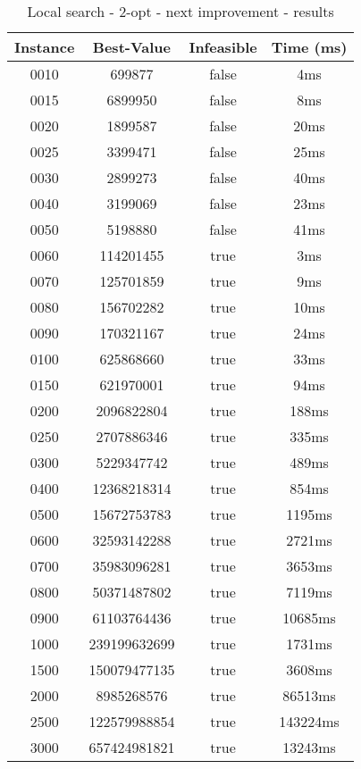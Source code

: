 \begin{table}
\centering
	\begin{tabular}{|| c | c | c | c ||} 
		\hline
		Instance & Best-Value & Infeasible & Time (ms) \\
		\hline\hline
0010 & 699877 & false & 4ms \\
0015 & 6899950 & false & 8ms \\
0020 & 1899587 & false & 20ms \\
0025 & 3399471 & false & 25ms \\
0030 & 2899273 & false & 40ms \\
0040 & 3199069 & false & 23ms \\
0050 & 5198880 & false & 41ms \\
0060 & 114201455 & true & 3ms \\
0070 & 125701859 & true & 9ms \\
0080 & 156702282 & true & 10ms \\
0090 & 170321167 & true & 24ms \\
0100 & 625868660 & true & 33ms \\
0150 & 621970001 & true & 94ms \\
0200 & 2096822804 & true & 188ms \\
0250 & 2707886346 & true & 335ms \\
0300 & 5229347742 & true & 489ms \\
0400 & 12368218314 & true & 854ms \\
0500 & 15672753783 & true & 1195ms \\
0600 & 32593142288 & true & 2721ms \\
0700 & 35983096281 & true & 3653ms \\
0800 & 50371487802 & true & 7119ms \\
0900 & 61103764436 & true & 10685ms \\
1000 & 239199632699 & true & 1731ms \\
1500 & 150079477135 & true & 3608ms \\
2000 & 8985268576 & true & 86513ms \\
2500 & 122579988854 & true & 143224ms \\
3000 & 657424981821 & true & 13243ms \\
		\hline
	\end{tabular}
\caption{Local search - 2-opt - next improvement - results}
\end{table}


